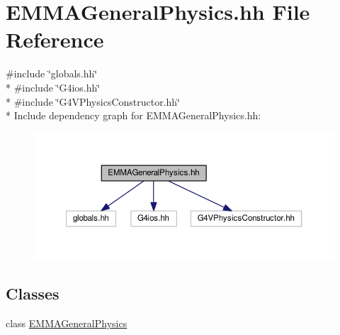 \hypertarget{EMMAGeneralPhysics_8hh}{}\section{E\+M\+M\+A\+General\+Physics.\+hh File Reference}
\label{EMMAGeneralPhysics_8hh}
{\ttfamily \#include \char`\"{}globals.\+hh\char`\"{}}\\*
{\ttfamily \#include \char`\"{}G4ios.\+hh\char`\"{}}\\*
{\ttfamily \#include \char`\"{}G4\+V\+Physics\+Constructor.\+hh\char`\"{}}\\*
Include dependency graph for E\+M\+M\+A\+General\+Physics.\+hh\+:
\nopagebreak
\begin{figure}[H]
\begin{center}
\leavevmode
\includegraphics[width=350pt]{EMMAGeneralPhysics_8hh__incl}
\end{center}
\end{figure}
\subsection*{Classes}
\begin{DoxyCompactItemize}
\item 
class \hyperlink{classEMMAGeneralPhysics}{E\+M\+M\+A\+General\+Physics}
\end{DoxyCompactItemize}
